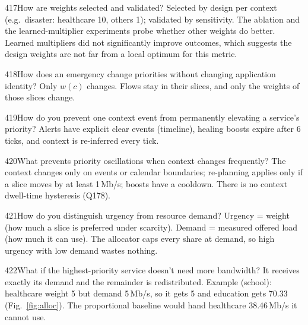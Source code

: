 \begin{qa}{417}{How are weights selected and validated?}
Selected by design per context (e.g.\ disaster: healthcare 10, others 1); validated by sensitivity. The
 ablation and the learned-multiplier experiments probe whether other weights do better. Learned
multipliers did not significantly improve outcomes, which suggests the design weights are not far from a local
optimum for this metric.
\end{qa}

\begin{qa}{418}{How does an emergency change priorities without changing application identity?}
Only $w(c)$ changes. Flows stay in their slices, and only the weights of those slices change.
\end{qa}

\begin{qa}{419}{How do you prevent one context event from permanently elevating a service's priority?}
Alerts have explicit clear events (timeline), healing boosts expire after 6 ticks, and context is re-inferred every tick.
\end{qa}

\begin{qa}{420}{What prevents priority oscillations when context changes frequently?}
The context changes only on events or calendar boundaries; re-planning applies only if a slice moves by at least
1\,Mb/s; boosts have a cooldown. There is no context dwell-time hysteresis (Q178).
\end{qa}

\begin{qa}{421}{How do you distinguish urgency from resource demand?}
Urgency = weight (how much a slice is preferred under scarcity). Demand = measured offered load (how much it can use).
The allocator caps every share at demand, so high urgency with low demand wastes nothing.
\end{qa}

\begin{qa}{422}{What if the highest-priority service doesn't need more bandwidth?}
It receives exactly its demand and the remainder is redistributed. Example (school): healthcare weight 5 but demand
5\,Mb/s, so it gets 5 and education gets 70.33 (Fig.~\ref{fig:alloc}). The proportional baseline would hand
healthcare 38.46\,Mb/s it cannot use.
\end{qa}

